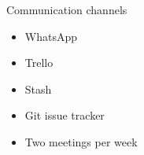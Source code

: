 \begin{frame}{Communication channels}
\begin{itemize}
		\item WhatsApp
		\item Trello
		\item Stash
		\item Git issue tracker
		\item Two meetings per week
	\end{itemize}
\end{frame}